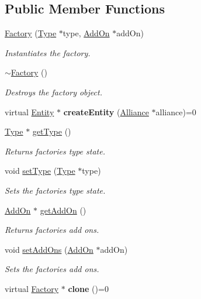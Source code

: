 \subsection*{Public Member Functions}
\begin{DoxyCompactItemize}
\item 
\hyperlink{classFactory_aca946f8877efb5b5bae700f74537d99d}{Factory} (\hyperlink{classType}{Type} $\ast$type, \hyperlink{classAddOn}{Add\+On} $\ast$add\+On)
\begin{DoxyCompactList}\small\item\em Instantiates the factory. \end{DoxyCompactList}\item 
\hyperlink{classFactory_a8f71456f48e4df402c778a44191ff40e}{$\sim$\+Factory} ()
\begin{DoxyCompactList}\small\item\em Destroys the factory object. \end{DoxyCompactList}\item 
\mbox{\label{classFactory_a80da95da98b407948dc815f2bca6a283}} 
virtual \hyperlink{classEntity}{Entity} $\ast$ {\bfseries create\+Entity} (\hyperlink{classAlliance}{Alliance} $\ast$alliance)=0
\item 
\hyperlink{classType}{Type} $\ast$ \hyperlink{classFactory_ac91051006ace7ec5bb6ecf0fe6d02d58}{get\+Type} ()
\begin{DoxyCompactList}\small\item\em Returns factories type state. \end{DoxyCompactList}\item 
void \hyperlink{classFactory_a7484d514b094114231dbeb3df70e9d0b}{set\+Type} (\hyperlink{classType}{Type} $\ast$type)
\begin{DoxyCompactList}\small\item\em Sets the factories type state. \end{DoxyCompactList}\item 
\hyperlink{classAddOn}{Add\+On} $\ast$ \hyperlink{classFactory_a994153930f59cafb280e91d5b100b5aa}{get\+Add\+On} ()
\begin{DoxyCompactList}\small\item\em Returns factories add ons. \end{DoxyCompactList}\item 
void \hyperlink{classFactory_a58dbf2659ee06c61b2dae1a9a36fac53}{set\+Add\+Ons} (\hyperlink{classAddOn}{Add\+On} $\ast$add\+On)
\begin{DoxyCompactList}\small\item\em Sets the factories add ons. \end{DoxyCompactList}\item 
\mbox{\label{classFactory_a00881ec5050751e4b747db5dfd266192}} 
virtual \hyperlink{classFactory}{Factory} $\ast$ {\bfseries clone} ()=0
\end{DoxyCompactItemize}


